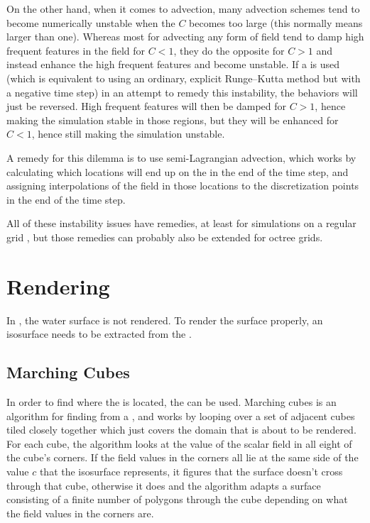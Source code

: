 On the other hand, when it comes to advection, many advection schemes tend to become numerically unstable when the  $C$ becomes too large (this normally means larger than one). Whereas most  for advecting any form of field tend to damp high frequent features in the field for $C < 1$, they do the opposite for $C > 1$ and instead enhance the high frequent features and become unstable. If a  is used (which is equivalent to using an ordinary, explicit Runge--Kutta method but with a negative time step) in an attempt to remedy this instability, the behaviors will just be reversed. High frequent features will then be damped for $C > 1$, hence making the simulation stable in those regions, but they will be enhanced for $C < 1$, hence still making the simulation unstable.

A remedy for this dilemma is to use semi-Lagrangian advection, which works by calculating which locations will end up on the  in the end of the time step, and assigning interpolations of the field in those locations to the discretization points in the end of the time step.

All of these instability issues have remedies, at least for simulations on a regular grid \citep{Stam1999,Kwatra2009,Lentine2012}, but those remedies can probably also be extended for octree grids.

\section{Rendering}

In \thisprojectwork, the water surface is not rendered. To render the surface properly, an isosurface needs to be extracted from the .

\subsection{Marching Cubes}
\label{sec:marchingcubesdescription}

In order to find where the  is located, the   can be used. Marching cubes is an algorithm for finding \isosurfaces from a , and works by looping over a set of adjacent cubes tiled closely together which just covers the domain that is about to be rendered. For each cube, the algorithm looks at the value of the scalar field in all eight of the cube's corners. If the field values in the corners all lie at the same side of the value $c$ that the isosurface represents, it figures that the surface doesn't cross through that cube, otherwise it does and the algorithm adapts a surface consisting of a finite number of polygons through the cube depending on what the field values in the corners are.

